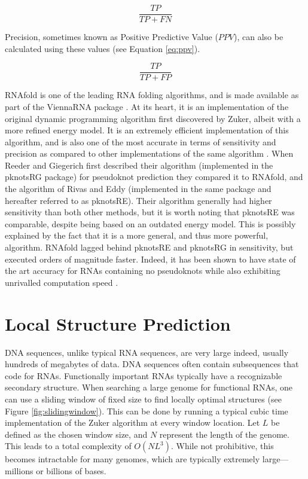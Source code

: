 \documentclass{cshonours}
\begin{document}
\begin{equation} \label{eq:tpr}
 \frac{TP}{TP + FN}
\end{equation}

Precision, sometimes known as Positive Predictive Value ($PPV$), can also be calculated
using these values (see Equation \ref{eq:ppv}).


\begin{equation} \label{eq:ppv}
 \frac{TP}{TP + FP}
\end{equation}


RNAfold \cite{lorenz2011viennarna} is one of the leading RNA folding algorithms, and is made available
as part of the ViennaRNA package \cite{lorenz2011viennarna}. At its heart, it is an implementation
of the original dynamic programming algorithm first discovered by Zuker, albeit
with a more refined energy model. It is an extremely efficient implementation of
this algorithm, and is also one of the most accurate in terms of sensitivity and
precision as compared to other implementations of the same algorithm \cite{lorenz2011viennarna}. When
Reeder and Giegerich \cite{reeder2004design} first described their algorithm (implemented in the pknotsRG package) for pseudoknot prediction they compared it to RNAfold, and the
algorithm of Rivas and Eddy \cite{rivas1999dynamic} (implemented in the same package and hereafter
referred to as pknotsRE). Their algorithm generally had higher sensitivity than
both other methods, but it is worth noting that pknotsRE was comparable, despite being based on an outdated energy model. This is possibly explained by
the fact that it is a more general, and thus more powerful, algorithm. RNAfold
lagged behind pknotsRE and pknotsRG in sensitivity, but executed orders of magnitude faster. Indeed, it has been shown to have state of the art accuracy for RNAs containing
no pseudoknots while also exhibiting unrivalled computation speed \cite{lorenz2011viennarna}.


\section{Local Structure Prediction}
\label{sec:locopt}


DNA sequences, unlike typical RNA sequences, are very large indeed, usually hundreds of megabytes of data. DNA sequences often contain subsequences that code for RNAs. Functionally important RNAs typically have
a recognizable secondary structure. When searching a large genome for functional RNAs, one can use a sliding window of fixed size to find locally optimal
structures (see Figure \ref{fig:slidingwindow}). This can be done by running a typical cubic time implementation of the Zuker algorithm at every window location. Let $L$ be defined as the chosen
window size, and $N$ represent the length of the genome. This leads to a total complexity of $O(NL^3)$. While not prohibitive, this becomes intractable for many
genomes, which are typically extremely large---millions or billions of bases. 
\end{document}
